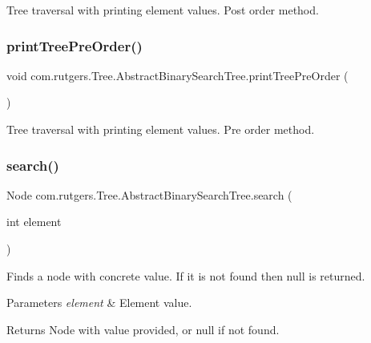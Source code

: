 Tree traversal with printing element values. Post order method. \mbox{\label{classcom_1_1rutgers_1_1Tree_1_1AbstractBinarySearchTree_a53e70e7883a86f60584f4585c07900ff}} 
\subsubsection{\texorpdfstring{print\+Tree\+Pre\+Order()}{printTreePreOrder()}}
{\footnotesize\ttfamily void com.\+rutgers.\+Tree.\+Abstract\+Binary\+Search\+Tree.\+print\+Tree\+Pre\+Order (\begin{DoxyParamCaption}{ }\end{DoxyParamCaption})}

Tree traversal with printing element values. Pre order method. \mbox{\label{classcom_1_1rutgers_1_1Tree_1_1AbstractBinarySearchTree_a91602e347d8f02a67319b1bdc02ce60f}} 
\subsubsection{\texorpdfstring{search()}{search()}}
{\footnotesize\ttfamily Node com.\+rutgers.\+Tree.\+Abstract\+Binary\+Search\+Tree.\+search (\begin{DoxyParamCaption}\item[{int}]{element }\end{DoxyParamCaption})}

Finds a node with concrete value. If it is not found then null is returned.


\begin{DoxyParams}{Parameters}
{\em element} & Element value. \\
\hline
\end{DoxyParams}
\begin{DoxyReturn}{Returns}
Node with value provided, or null if not found. 
\end{DoxyReturn}


